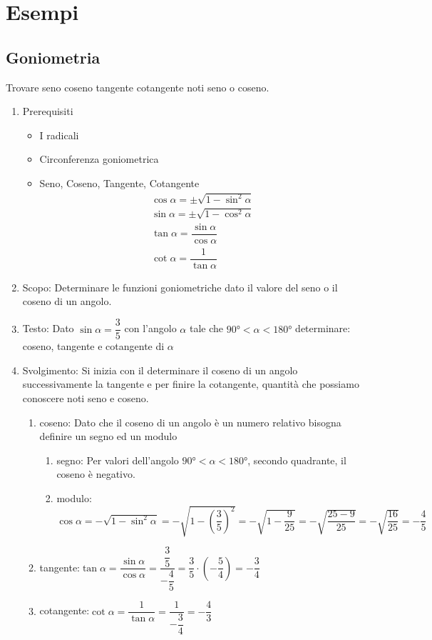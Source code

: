 \chapter{Esempi}
\section{Goniometria}
\label{sec:EsempiGoniometria}
\begin{table}[H]
	\caption{Trovare seno coseno tangente cotangente noti seno o coseno.}
	\label{tab:trovaresencosnoti}
\begin{enumerate}
	\item Prerequisiti 
\begin{itemize}
	\item I radicali
	\item Circonferenza goniometrica
	\item Seno, Coseno, Tangente, Cotangente
  \begin {align*}
	\cos\alpha=\pm\sqrt{1-\sin^2\alpha}\\
	\sin\alpha=\pm\sqrt{1-\cos^2\alpha}\\
	\tan\alpha=\dfrac{\sin\alpha}{\cos\alpha}\\
	\cot\alpha=\dfrac{1}{\tan\alpha}
	\end{align*}
\end{itemize}
  \item Scopo: Determinare le funzioni goniometriche dato il valore del seno o il coseno di un angolo.
  \item Testo: Dato $\sin\alpha=\dfrac{3}{5}$ con l'angolo $\alpha$ tale che $\ang{90}<\alpha<\ang{180}$ determinare: coseno, tangente e cotangente di $\alpha$
  \item Svolgimento: Si inizia con il determinare il coseno di un angolo successivamente la tangente e per finire la cotangente, quantità che possiamo conoscere noti seno e coseno. 
  \begin{enumerate}
	\item coseno: Dato che il coseno di un angolo è un numero relativo bisogna definire un segno ed un modulo
	\begin{enumerate}
	\item segno: Per valori dell'angolo  $\ang{90}<\alpha<\ang{180}$, secondo quadrante, il coseno è negativo. 
	\item modulo: $\cos\alpha=-\sqrt{1-\sin^2\alpha}=-\sqrt{1-\left(\dfrac{3}{5}\right)^2}=-\sqrt{1-\dfrac{9}{25}}=-\sqrt{\dfrac{25-9}{25}}=-\sqrt{\dfrac{16}{25}}=-\dfrac{4}{5}$
\end{enumerate}
	\item tangente:$\tan\alpha=\dfrac{\sin\alpha}{\cos\alpha}=\dfrac{\dfrac{3}{5}}{-\dfrac{4}{5}}=\dfrac{3}{5}\cdot\left(-\dfrac{5}{4} \right)=-\dfrac{3}{4}$
  \item cotangente:$\cot\alpha=\dfrac{1}{\tan\alpha}=\dfrac{1}{-\dfrac{3}{4}}=-\dfrac{4}{3}$
\end{enumerate}
 \end{enumerate}
\end{table}
